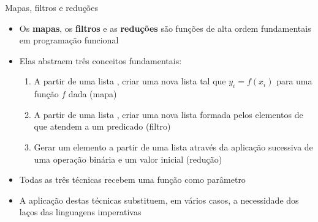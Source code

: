 \begin{frame}[fragile]{Mapas, filtros e reduções}

    \begin{itemize}
        \item Os \textbf{mapas}, os \textbf{filtros} e as \textbf{reduções} são funções de alta 
            ordem fundamentais em programação funcional

        \item Elas abstraem três conceitos fundamentais:
        \begin{enumerate}
            \item A partir de uma lista , criar uma nova lista 
                tal que $y_i = f(x_i)$ para uma função $f$ dada (mapa)

            \item A partir de uma lista , criar uma nova lista 
                formada pelos elementos  de  que atendem a um
                predicado  (filtro)

            \item Gerar um elemento  a partir de uma lista 
                através da aplicação sucessiva de uma operação binária  e um
                valor inicial  (redução)
        \end{enumerate}

        \item Todas as três técnicas recebem uma função como parâmetro

        \item A aplicação destas técnicas substituem, em vários casos, a necessidade dos laços das
            linguagens imperativas
    \end{itemize}

\end{frame}

